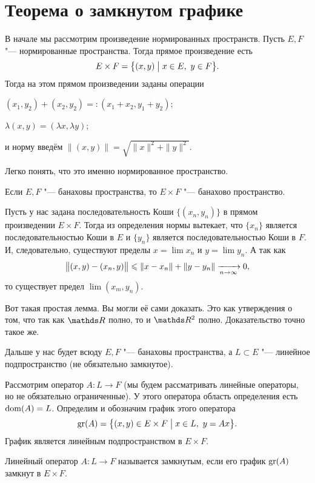 \section{Теорема о замкнутом графике}
В начале мы рассмотрим произведение нормированных пространств. Пусть $E,F$ "--- нормированные пространства. Тогда прямое произведение есть 
\[
E\times F = \big\{(x,y)\bigm| x\in E,\ y\in F\big\}.
\]
Тогда на этом прямом произведении заданы операции
\begin{azItems}
\item $(x_1,y_2)+(x_2,y_2) =: (x_1+x_2,y_1+y_2)$;
\item $\lambda (x,y) = (\lambda x,\lambda y)$;
\item и норму введём $\big\|(x,y)\big\| = \sqrt{\|x\|^2+\|y\|^2}$.
\end{azItems}
Легко понять, что это именно нормированное пространство.

\begin{Lem}
  Если $E,F$ "--- банаховы пространства, то $E\times F$ "--- банахово пространство.
\end{Lem}
\begin{Proof}
  Пусть у нас задана последовательность Коши $\big\{(x_n,y_n)\big\}$ в прямом произведении $E\times F$. Тогда из определения нормы вытекает, что $\{x_n\}$ является последовательностью Коши в $E$ и $\{y_n\}$ является последовательностью Коши в $F$. И, следовательно, существуют пределы $x = \lim x_n$ и $y = \lim y_n$. А так как
\[
  \big\|(x,y) - (x_n,y)\big\|\leqslant \|x-x_n\| + \|y-y_n\|\xrightarrow[n\rightarrow\infty]{}0,
\]
то существует предел $\lim(x_m,y_n)$.
\end{Proof}

Вот такая простая лемма. Вы могли её сами доказать. Это как утверждения о том, что так как $\R$  полно, то и $\R^2$ полно. Доказательство точно такое же.

Дальше у нас будет всюду $E,F$ "--- банаховы пространства, а $L\subset E$ "--- линейное подпространство (не обязательно замкнутое).

Рассмотрим оператор $A\colon L\to F$ (мы будем рассматривать линейные операторы, но не обязательно ограниченные). У этого оператора область определения есть $\operatorname{dom} (A) = L$.
Определим и обозначим график этого оператора
\[
  \operatorname{gr}(A) = \big\{(x,y)\in E\times F\bigm| x\in L,\ y= Ax\big\}.
\]
График является линейным подпространством в $E\times F$.
\begin{Def}
  Линейный оператор $A\colon L\to F$ называется замкнутым, если его график $\operatorname{gr}(A)$ замкнут в $E\times F$.
\end{Def}

